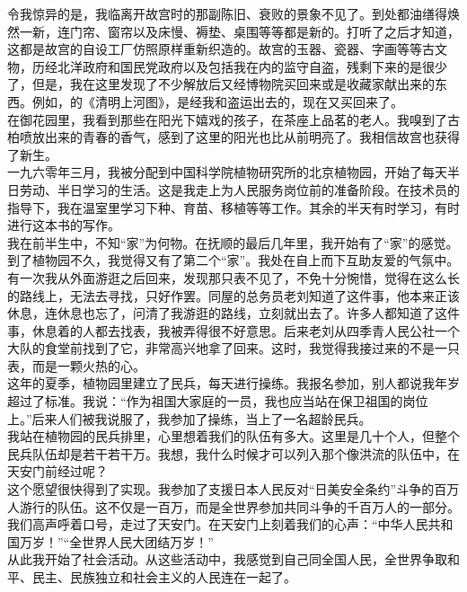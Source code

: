 令我惊异的是，我临离开故宫时的那副陈旧、衰败的景象不见了。到处都油缮得焕然一新，连门帘、窗帘以及床慢、褥垫、桌围等等都是新的。打听了之后才知道，这都是故宫的自设工厂仿照原样重新织造的。故宫的玉器、瓷器、字画等等古文物，历经北洋政府和国民党政府以及包括我在内的监守自盗，残剩下来的是很少了，但是，我在这里发现了不少解放后又经博物院买回来或是收藏家献出来的东西。例如，的《清明上河图》，是经我和盗运出去的，现在又买回来了。\\

在御花园里，我看到那些在阳光下嬉戏的孩子，在茶座上品茗的老人。我嗅到了古柏喷放出来的青春的香气，感到了这里的阳光也比从前明亮了。我相信故宫也获得了新生。\\

一九六零年三月，我被分配到中国科学院植物研究所的北京植物园，开始了每天半日劳动、半日学习的生活。这是我走上为人民服务岗位前的准备阶段。在技术员的指导下，我在温室里学习下种、育苗、移植等等工作。其余的半天有时学习，有时进行这本书的写作。\\

我在前半生中，不知“家”为何物。在抚顺的最后几年里，我开始有了“家”的感觉。到了植物园不久，我觉得又有了第二个“家”。我处在自上而下互助友爱的气氛中。有一次我从外面游逛之后回来，发现那只表不见了，不免十分惋惜，觉得在这么长的路线上，无法去寻找，只好作罢。同屋的总务员老刘知道了这件事，他本来正该休息，连休息也忘了，问清了我游逛的路线，立刻就出去了。许多人都知道了这件事，休息着的人都去找表，我被弄得很不好意思。后来老刘从四季青人民公社一个大队的食堂前找到了它，非常高兴地拿了回来。这时，我觉得我接过来的不是一只表，而是一颗火热的心。\\

这年的夏季，植物园里建立了民兵，每天进行操练。我报名参加，别人都说我年岁超过了标准。我说：“作为祖国大家庭的一员，我也应当站在保卫祖国的岗位上。”后来人们被我说服了，我参加了操练，当上了一名超龄民兵。\\

我站在植物园的民兵排里，心里想着我们的队伍有多大。这里是几十个人，但整个民兵队伍却是若干若干万。我想，我什么时候才可以列入那个像洪流的队伍中，在天安门前经过呢？\\

这个愿望很快得到了实现。我参加了支援日本人民反对“日美安全条约”斗争的百万人游行的队伍。这不仅是一百万，而是全世界参加共同斗争的千百万人的一部分。我们高声呼着口号，走过了天安门。在天安门上刻着我们的心声：“中华人民共和国万岁！”“全世界人民大团结万岁！”\\

从此我开始了社会活动。从这些活动中，我感觉到自己同全国人民，全世界争取和平、民主、民族独立和社会主义的人民连在一起了。\\

